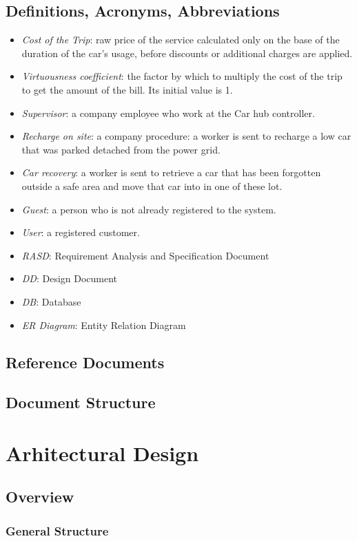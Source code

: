 \documentclass[a4paper,12pt,oneside]{report}
\begin{document}
\section{Definitions, Acronyms, Abbreviations}
\begin{itemize}
\item \emph{Cost of the Trip}: raw price of the service calculated only on the base of the duration of the car's usage, before discounts or additional charges are applied.
\item \emph{Virtuousness coefficient}: the factor by which to multiply the cost of the trip to get the amount of the bill. Its initial value is 1.
\item \emph{Supervisor}: a company employee who work at the Car hub controller.
\item \emph{Recharge on site}: a company procedure: a worker is sent to recharge a low car that was parked detached from the power grid.
\item \emph{Car recovery}: a worker is sent to retrieve a car that has been forgotten outside a safe area and move that car into in one of these lot.
\item \emph{Guest}: a person who is not already registered to the system.
\item \emph{User}: a registered customer.
\item \emph{RASD}: Requirement Analysis and Specification Document
\item \emph{DD}: Design Document
\item \emph{DB}: Database
\item \emph{ER Diagram}: Entity Relation Diagram
\end{itemize}
\newpage
\section{Reference Documents}
\newpage
\section{Document Structure}

\chapter{Arhitectural Design}
\section{Overview}
\subsection{General Structure}
\end{document}

